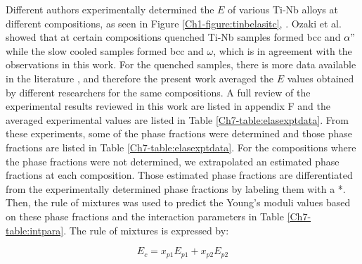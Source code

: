Different authors experimentally determined the $E$ of various Ti-Nb alloys at different compositions, as seen in Figure \ref{Ch1-figure:tinbelasitc}, \cite{Friak2012,Timoshevskii2011,Friak2012,Karre2015}. Ozaki et al. \cite{Ozaki2004} showed that at certain compositions quenched Ti-Nb samples formed bcc and $\alpha"$ while the slow cooled samples formed bcc and $\omega$, which is in agreement with the observations in this work. For the quenched samples, there is more data available in the literature \cite{Friak2012,Timoshevskii2011,Friak2012,Karre2015}, and therefore the present work averaged the $E$ values obtained by different researchers for the same compositions. A full review of the experimental results reviewed in this work are listed in appendix F and the averaged experimental values are listed in Table \ref{Ch7-table:elasexptdata}. From these experiments, some of the phase fractions were determined \cite{Friak2012} and those phase fractions are listed in Table \ref{Ch7-table:elasexptdata}. For the compositions where the phase fractions were not determined, we extrapolated an estimated phase fractions at each composition. Those estimated phase fractions are differentiated from the experimentally determined phase fractions by labeling them with a *. Then, the rule of mixtures was used to predict the Young's moduli values based on these phase fractions and the interaction parameters in Table \ref{Ch7-table:intpara}. The rule of mixtures is expressed by:

\begin{equation}
\label{eq:ruleofmix}
E_{c}=x_{p1}E_{p1}+x_{p2}E_{p2}
\end{equation}

